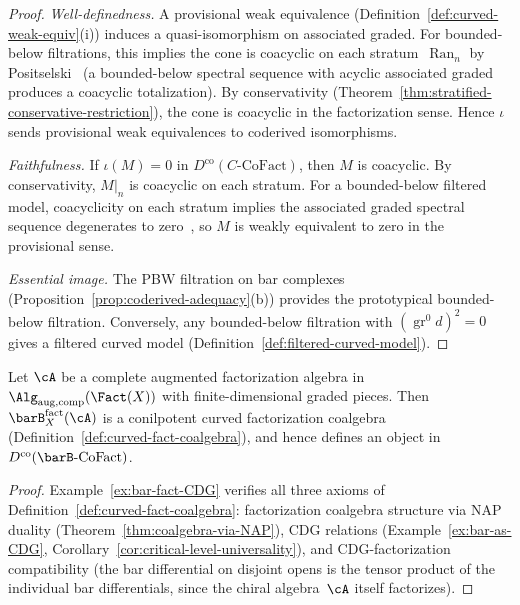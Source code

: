 \begin{proof}
\emph{Well-definedness.}
A provisional weak equivalence
(Definition~\ref{def:curved-weak-equiv}(i)) induces a
quasi-isomorphism on associated graded.  For bounded-below
filtrations, this implies the cone is coacyclic on each
stratum~$\operatorname{Ran}_n$ by
Positselski~\cite[Proposition~3.5]{Positselski11} (a
bounded-below spectral sequence with acyclic associated graded
produces a coacyclic totalization).  By conservativity
(Theorem~\ref{thm:stratified-conservative-restriction}), the cone
is coacyclic in the factorization sense.  Hence $\iota$
sends provisional weak equivalences to coderived isomorphisms.

\emph{Faithfulness.}
If $\iota(M) = 0$ in $D^{\mathrm{co}}(C\text{-}\mathrm{CoFact})$,
then $M$ is coacyclic.  By conservativity, $M|_n$ is coacyclic
on each stratum.  For a bounded-below filtered model, coacyclicity
on each stratum implies the associated graded spectral sequence
degenerates to zero~\cite[Proposition~3.5]{Positselski11}, so
$M$ is weakly equivalent to zero in the provisional sense.

\emph{Essential image.}
The PBW filtration on bar complexes
(Proposition~\ref{prop:coderived-adequacy}(b)) provides the
prototypical bounded-below filtration.  Conversely, any
bounded-below filtration with
$(\operatorname{gr}^0 d)^2 = 0$ gives a filtered curved model
(Definition~\ref{def:filtered-curved-model}).
\end{proof}

\begin{proposition}
\label{prop:bar-ran-well-defined}
Let $\cA$ be a complete augmented factorization algebra in
$\Alg_{\mathrm{aug,comp}}(\Fact(X))$ with finite-dimensional
graded pieces.  Then $\barB_X^{\mathrm{fact}}(\cA)$ is a
conilpotent curved factorization coalgebra
\textup{(}Definition~\textup{\ref{def:curved-fact-coalgebra}}),
and hence defines an object in
$D^{\mathrm{co}}(\barB\text{-}\mathrm{CoFact})$.
\end{proposition}

\begin{proof}
Example~\ref{ex:bar-fact-CDG} verifies all three axioms of
Definition~\ref{def:curved-fact-coalgebra}: factorization
coalgebra structure via NAP duality
(Theorem~\ref{thm:coalgebra-via-NAP}), CDG relations
(Example~\ref{ex:bar-as-CDG},
Corollary~\ref{cor:critical-level-universality}), and
CDG-factorization compatibility (the bar differential on disjoint
opens is the tensor product of the individual bar differentials,
since the chiral algebra~$\cA$ itself factorizes).
\end{proof}


